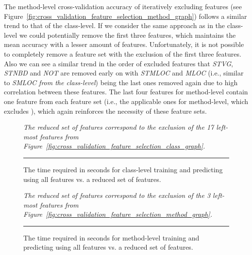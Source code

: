 The method-level cross-validation accuracy of iteratively excluding features (see Figure~\ref{fig:cross_validation_feature_selection_method_graph}) follows a similar trend to that of the class-level. If we consider the same approach as in the class-level we could potentially remove the first three features, which maintains the mean accuracy with a lesser amount of features. Unfortunately, it is not possible to completely remove a feature set with the exclusion of the first three features. Also we can see a similar trend in the order of excluded features that \emph{STVG}, \emph{STNBD} and \emph{NOT} are removed early on with \emph{STMLOC} and \emph{MLOC} (i.e., similar to \emph{SMLOC from the class-level}) being the last ones removed again due to high correlation between these features. The last four features for method-level contain one feature from each feature set (i.e., the applicable ones for method-level, which excludes ), which again reinforces the necessity of these feature sets.

\begin{figure}[ht!]
  \centering
  \begin{adjustbox}{max size={.95\textwidth}{.95\textheight}}
    
  \end{adjustbox}
  \caption{The time required in seconds for class-level training and predicting using all features vs. a reduced set of features.}  \vspace{1mm}
  \footnotesize{\emph{The reduced set of features correspond to the exclusion of the 17 left-most features from Figure~\ref{fig:cross_validation_feature_selection_class_graph}.}}
  \vspace{2mm}
  \hrule
  \label{fig:class_train_prediction_default_time_graph}
\end{figure}

\begin{figure}[ht!]
  \centering
  \begin{adjustbox}{max size={.95\textwidth}{.95\textheight}}
    
  \end{adjustbox}
  \caption{The time required in seconds for method-level training and predicting using all features vs. a reduced set of features.}
  \vspace{1mm}
  \footnotesize{\emph{The reduced set of features correspond to the exclusion of the 3 left-most features from Figure~\ref{fig:cross_validation_feature_selection_method_graph}.}}
  \vspace{2mm}
  \hrule
  \label{fig:method_train_prediction_default_time_graph}
\end{figure}

